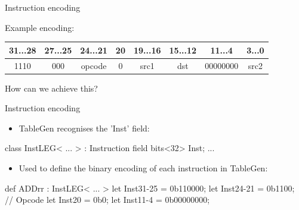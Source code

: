 
\begin{frame}[fragile]{Instruction encoding}

Example encoding:

\vspace{1ex}

\begin{tabular}{|c|c|c|c|c|c|c|c|}
\hline 
31...28 & 27...25 & 24...21 & 20 & 19...16 & 15...12 & 11...4 & 3...0\tabularnewline
\hline 
1110 & 000 & opcode & 0 & src1 & dst & 00000000 & src2\tabularnewline
\hline 
\end{tabular}

\vspace{2ex}

How can we achieve this?

\vspace{1ex}


\end{frame}


\begin{frame}[fragile]{Instruction encoding}

\begin{itemize}
    \item TableGen recognises the 'Inst' field:
\end{itemize}

\begin{codebox}
class InstLEG< ... > : Instruction {
  field bits<32> Inst;
  ...
}
\end{codebox}

\begin{itemize}
    \item Used to define the binary encoding of each instruction in TableGen:
\end{itemize}

\begin{codebox}
def ADDrr : InstLEG< ... > {
  let Inst{31-25} = 0b110000;
  let Inst{24-21} = 0b1100;      // Opcode
  let Inst{20}    = 0b0;
  let Inst{11-4}  = 0b00000000;
}
\end{codebox}

\end{frame}

